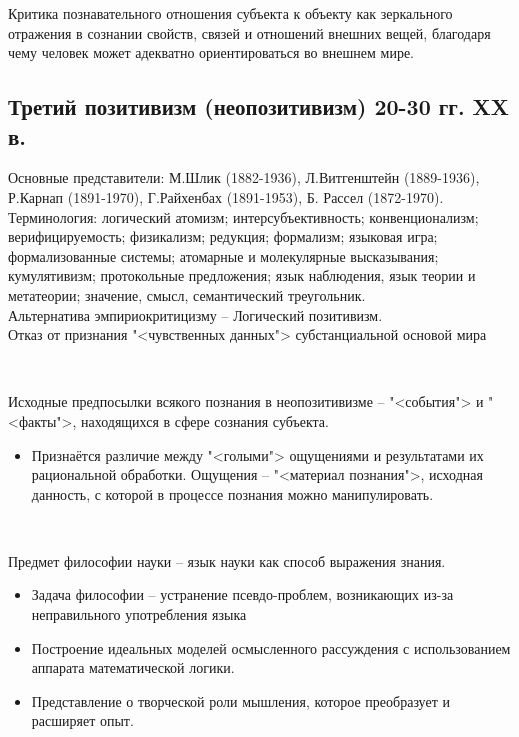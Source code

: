 \documentclass[main.tex]{subfiles}
\begin{document}
{\parindent0pt
Критика познавательного отношения субъекта к объекту как зеркального отражения в сознании свойств, связей и отношений внешних вещей, благодаря чему человек может адекватно ориентироваться во внешнем мире.
}



\subsection{Третий позитивизм (неопозитивизм) 20-30 гг. XX в.}

{\parindent0pt

Основные представители: М.Шлик (1882-1936), Л.Витгенштейн (1889-1936), Р.Карнап (1891-1970), Г.Райхенбах (1891-1953), Б. Рассел (1872-1970).
\\

Терминология:
логический атомизм;
интерсубъективность;
конвенционализм;
верифицируемость;
физикализм;
редукция;
формализм;
языковая игра;
формализованные системы;
атомарные и молекулярные высказывания;
кумулятивизм;
протокольные предложения;
язык наблюдения, язык теории и метатеории;
значение, смысл, семантический треугольник.
\\

Альтернатива эмпириокритицизму -- Логический позитивизм.
\\


Отказ от признания "<чувственных данных"> субстанциальной основой мира
}
\ \\

{\parindent0pt
Исходные предпосылки всякого познания в неопозитивизме -- "<события"> и "<факты">, находящихся в сфере сознания субъекта.
\begin{itemize}[nosep,leftmargin=0.5cm]
\item Признаётся различие между "<голыми"> ощущениями и результатами их рациональной обработки.
Ощущения -- "<материал познания">, исходная данность, с которой в процессе познания можно манипулировать.
\end{itemize}
}
\ 

{\parindent0pt
Предмет философии науки -- язык науки как способ выражения знания.
\begin{itemize}[nosep,leftmargin=0.5cm]
\item Задача философии -- устранение псевдо-проблем, возникающих из-за неправильного употребления языка
\item Построение идеальных моделей осмысленного рассуждения с использованием аппарата математической логики.
\item Представление о творческой роли мышления, которое преобразует и расширяет опыт.
\end{itemize}
}
\ 
\end{document}
